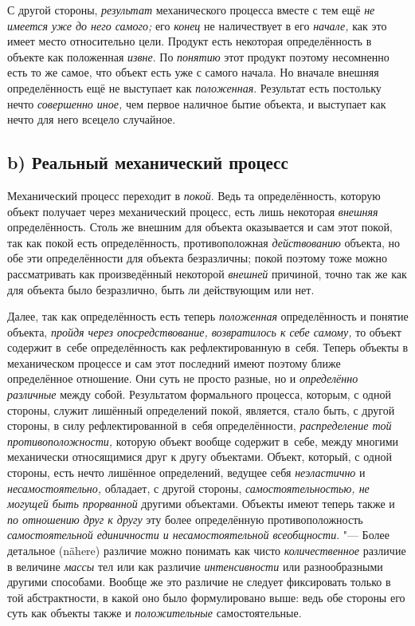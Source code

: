 С другой стороны, {\em результат} механического процесса вместе с тем ещё
{\em не имеется уже до него самого;} его {\em конец} не наличествует в его
{\em начале,} как это имеет место относительно цели. Продукт есть некоторая
определённость в объекте как положенная {\em извне}. По {\em понятию}
этот продукт поэтому несомненно есть то же самое, что объект
есть уже с самого начала. Но вначале внешняя определённость ещё не
выступает как {\em положенная}. Результат есть постольку нечто
{\em совершенно иное,} чем первое наличное бытие объекта, и выступает
как нечто для него всецело случайное.

\subsection[b) Реальный механический процесс]{b) Реальный механический процесс}

Механический процесс переходит в {\em покой}. Ведь та
определённость, которую объект получает через механический процесс, есть
лишь некоторая {\em внешняя}
определённость. Столь же внешним для объекта оказывается и
сам этот покой, так как покой есть определённость, противоположная
{\em действованию}
объекта, но обе эти определённости для объекта безразличны;
покой поэтому тоже можно рассматривать как произведённый некоторой
{\em внешней} причиной,
точно так же как для объекта было безразлично, быть ли действующим или нет.

Далее, так как определённость есть теперь
{\em положенная}
определённость и понятие объекта,
{\em пройдя через опосредствование,
возвратилось к себе самому,} то объект содержит в~себе
определённость как рефлектированную в~себя. Теперь объекты в
механическом процессе и сам этот последний имеют поэтому ближе определённое
отношение. Они суть не просто разные, но и
{\em определённо различные}
между собой. Результатом формального процесса, которым, с
одной стороны, служит лишённый определений покой, является, стало быть, с
другой стороны, в силу рефлектированной в~себя определённости,
{\em распределение той
противоположности,} которую объект вообще содержит в~себе,
между многими механически относящимися друг к другу объектами. Объект,
который, с одной стороны, есть нечто лишённое определений, ведущее себя
{\em неэластично} и
{\em несамостоятельно,}
обладает, с другой стороны,
{\em самостоятельностью, не могущей быть
прорванной} другими объектами. Объекты имеют теперь также и
{\em по отношению друг к другу}
эту более определённую противоположность
{\em самостоятельной единичности и
несамостоятельной всеобщности}. "--- Более детальное (nähere)
различие можно понимать как чисто
{\em количественное}
различие в величине
{\em массы} тел или как
различие {\em интенсивности}
или разнообразными другими способами. Вообще же это различие
не следует фиксировать только в той абстрактности, в какой оно было
формулировано выше: ведь обе стороны его суть как объекты также и
{\em положительные}
самостоятельные.

